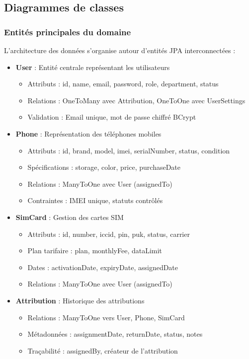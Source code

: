 \documentclass[12pt,a4paper]{report}
\begin{document}
\subsection{Diagrammes de classes}

\subsubsection{Entités principales du domaine}
L'architecture des données s'organise autour d'entités JPA interconnectées :

\begin{itemize}
\item \textbf{User} : Entité centrale représentant les utilisateurs
  \begin{itemize}
  \item Attributs : id, name, email, password, role, department, status
  \item Relations : OneToMany avec Attribution, OneToOne avec UserSettings
  \item Validation : Email unique, mot de passe chiffré BCrypt
  \end{itemize}

\item \textbf{Phone} : Représentation des téléphones mobiles
  \begin{itemize}
  \item Attributs : id, brand, model, imei, serialNumber, status, condition
  \item Spécifications : storage, color, price, purchaseDate
  \item Relations : ManyToOne avec User (assignedTo)
  \item Contraintes : IMEI unique, statuts contrôlés
  \end{itemize}

\item \textbf{SimCard} : Gestion des cartes SIM
  \begin{itemize}
  \item Attributs : id, number, iccid, pin, puk, status, carrier
  \item Plan tarifaire : plan, monthlyFee, dataLimit
  \item Dates : activationDate, expiryDate, assignedDate
  \item Relations : ManyToOne avec User (assignedTo)
  \end{itemize}

\item \textbf{Attribution} : Historique des attributions
  \begin{itemize}
  \item Relations : ManyToOne vers User, Phone, SimCard
  \item Métadonnées : assignmentDate, returnDate, status, notes
  \item Traçabilité : assignedBy, créateur de l'attribution
  \end{itemize}
\end{itemize}
\end{document}
